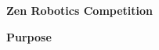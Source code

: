 \documentclass{article}
\begin{document}
	
{\huge \textbf{Zen Robotics Competition}}

\vspace{1cm}

{\huge \textbf{Purpose}}
\end{document}
